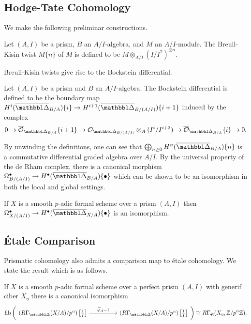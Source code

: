 \subsection{Hodge-Tate Cohomology}\label{subsec: Hodge-Tate cohomology}
We make the following preliminar constructions. 
\begin{definition}\label{def: Breuil-Kisin twist}
    Let $(A,I)$ be a prism, $B$ an $A/I$-algebra, and $M$ an $A/I$-module. The Breuil-Kisin twist $M\{n\}$ of $M$ is defined to be $M\otimes_{A/I}(I/I^{2})^{\otimes n}$. 
\end{definition}
Breuil-Kisin twists give rise to the Bockstein differential. 
\begin{definition}\label{def: Bockstein differential}
    Let $(A,I)$ be a prism and  $B$ an $A/I$-algebra. The Bockstein differential is defined to be the boundary map $H^{i}(\overline{\prism}_{B/A})\{i\}\to H^{i+1}(\overline{\prism}_{B/(A/I)})\{i+1\}$ induced by the complex
    $$0\to\overline{\Ocal}_{\prism_{B/A}}\{i+1\}\to\Ocal_{\prism_{B/(A/I)}}\otimes_{A}(I^{i}/I^{i+2})\to\overline{\Ocal}_{\prism_{B/A}}\{i\}\to0.$$
\end{definition}
By unwinding the definitions, one can see that $\bigoplus_{n\geq0}H^{n}(\overline{\prism}_{B/A})\{n\}$ is a commutative differential graded algebra over $A/I$. By the universal property of the de Rham complex, there is a canonical morphism $\Omega^{\bullet}_{B/(A/I)}\to H^{\bullet}(\overline{\prism}_{B/A})\{\bullet\}$ which can be shown to be an isomorphism in both the local and global settings. 
\begin{theorem}\label{thm: Hodge-Tate comparison}
    If $X$ is a smooth $p$-adic formal scheme over a prism $(A, I)$ then $\Omega^{\bullet}_{X/(A/I)}\to H^{\bullet}(\overline{\prism}_{X/A})\{\bullet\}$ is an isomorphism.
\end{theorem}
\subsection{\'{E}tale Comparison}\label{subsec: etale comparison}
Prismatic cohomology also admits a comparison map to \'{e}tale cohomology. We state the result which is as follows. 
\begin{theorem}\label{thm: etale comparison}
    If $X$ is a smooth $p$-adic formal scheme over a perfect prism $(A, I)$ with generif ciber $X_{\eta}$ there is a canonical isomorphism 
    $$\mathrm{fib}\left(%
    \begin{tikzcd}
        {\left(R\Gamma_{\prism}(X/A)/p^{n}\right)\left[\frac{1}{I}\right]} && {\left(R\Gamma_{\prism}(X/A)/p^{n}\right)\left[\frac{1}{I}\right]}
        \arrow["{\widetilde{\varphi}_{A}-1}", from=1-1, to=1-3]
    \end{tikzcd}\right)\cong R\Gamma_{\et}(X_{\eta}, \ZZ/p^{n}\ZZ).$$
\end{theorem}